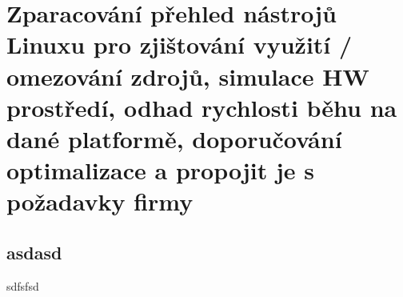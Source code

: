 \section{Zparacování přehled nástrojů Linuxu pro zjištování využití / omezování zdrojů, simulace HW prostředí, odhad rychlosti běhu na dané platformě, doporučování optimalizace a propojit je s požadavky firmy}

\subsection{asdasd}

sdfsfsd